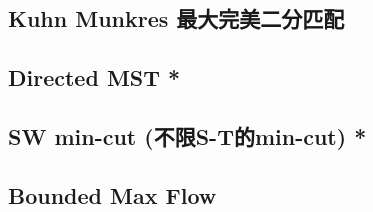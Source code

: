 \documentclass[a4paper,10pt,twocolumn,oneside]{article}
\begin{document}
%

\subsection{Kuhn Munkres 最大完美二分匹配}


\subsection{Directed MST *}


\subsection{SW min-cut (不限S-T的min-cut) *}


\subsection{Bounded Max Flow}


% 

%

% 

% 

% 
\end{document}
